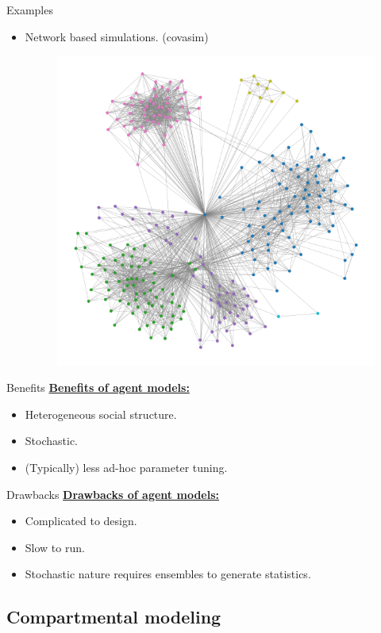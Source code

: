 \documentclass[aspectratio=169]{beamer}
\begin{document}
\begin{frame}{Examples}
    \vfill
    \begin{itemize}
    \pause
        \item Network based simulations. (covasim)
        \vspace*{.75cm}
                \begin{figure}[H]
                    \centering
                    \includegraphics[width=.4\textwidth]{figures/network_diagram.png}
                \end{figure}
            \end{itemize}
            \vfill
\end{frame}

\begin{frame}{Benefits}
    \vfill
    \textbf{\underline{Benefits of agent models:}}
    \begin{itemize}
        \pause
        \item Heterogeneous social structure.
        \pause
        \item Stochastic.
        \pause
        \item (Typically) less ad-hoc parameter tuning.
    \end{itemize}
    \vfill
\end{frame}

\begin{frame}{Drawbacks}
    \vfill
    \textbf{\underline{Drawbacks of agent models:}}
    \begin{itemize}
        \pause
        \item Complicated to design.
        \pause
        \item Slow to run.
        \pause
        \item Stochastic nature requires ensembles to generate statistics.
    \end{itemize}
    \vfill
\end{frame}

\subsection{Compartmental modeling}
\end{document}
